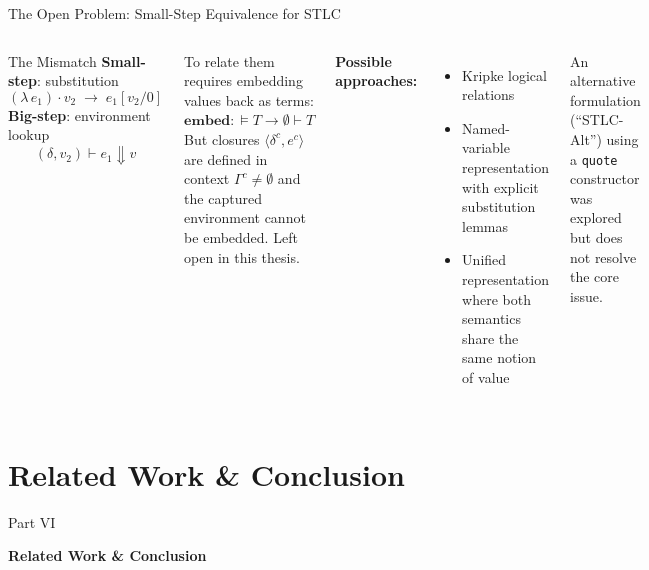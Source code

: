 \documentclass[10pt,compress,aspectratio=169]{beamer}
\begin{document}
\begin{frame}{The Open Problem: Small-Step Equivalence for STLC}
  \begin{columns}[T]
      \begin{block}{The Mismatch}
        \textbf{Small-step}: substitution
        \[ (\lambda\, e_1) \cdot v_2 \;\longrightarrow\; e_1[v_2/0] \]
        \textbf{Big-step}: environment lookup
        \[ (\delta, v_2) \vdash e_1 \Downarrow v \]
      \end{block}
      \medskip
      To relate them requires embedding values back as terms:\\[4pt]
      $\mathbf{embed} : \vDash T \to \emptyset \vdash T$\\[4pt]
      But closures $\langle \delta^c, e^c \rangle$ are defined in context $\Gamma^c \ne \emptyset$ and the captured environment cannot be embedded.
      \alert{Left open in this thesis.}
      \bigskip

      \textbf{Possible approaches:}
      \begin{itemize}
        \item Kripke logical relations
        \item Named-variable representation with explicit substitution lemmas
        \item Unified representation where both semantics share the same notion of value
      \end{itemize}
      \bigskip
      {\footnotesize An alternative formulation (``STLC-Alt'') using a \texttt{quote} constructor was explored but does not resolve the core issue.}
  \end{columns}
\end{frame}

\section{Related Work \& Conclusion}

\begin{frame}{}
  \centering\vfill
  {Part VI\par}
  \bigskip
  {\Large\bfseries Related Work \& Conclusion}
  \vfill
\end{frame}
\end{document}
